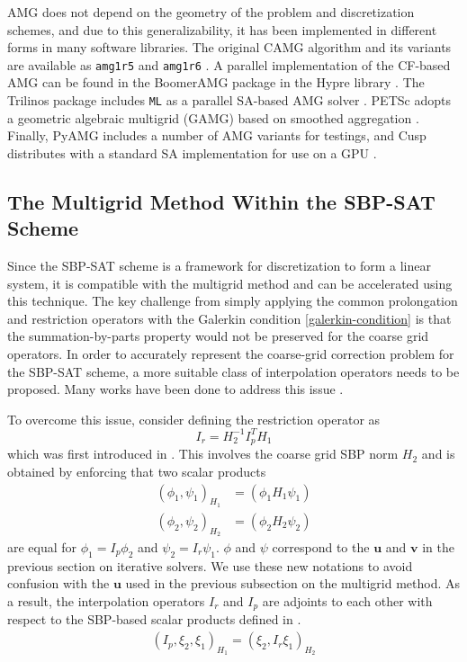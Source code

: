 AMG does not depend on the geometry of the problem and discretization schemes, and due to this generalizability, it has been implemented in different forms in many software libraries. The original CAMG algorithm and its variants are available as \texttt{amg1r5} and \texttt{amg1r6} \citep{ruge1987algebraic}. A parallel implementation of the CF-based AMG can be found in the BoomerAMG package in the Hypre library \citep{yang2002boomeramg}. The Trilinos package includes \texttt{ML} as a parallel SA-based AMG solver \citep{gee2006ml}.
PETSc adopts a geometric algebraic multigrid (GAMG) based on smoothed aggregation \citep{petsc-web-page}.
Finally, PyAMG includes a number of AMG variants for testings, and Cusp distributes with a standard SA implementation for use on a GPU \citep{dalton2014cusp,bell2022pyamg}. 

\subsection{The Multigrid Method Within the SBP-SAT Scheme}
Since the SBP-SAT scheme is a framework for discretization to form a linear system, it is compatible with the multigrid method and can be accelerated using this technique. The key challenge from simply applying the common prolongation and restriction operators with the Galerkin condition \autoref{galerkin-condition} is that the summation-by-parts property would not be preserved for the coarse grid operators. In order to accurately represent the coarse-grid correction problem for the SBP-SAT scheme, a more suitable class of interpolation operators needs to be proposed. Many works have been done to address this issue \citep{ruggiu2018new,RUGGIU2018216}.

To overcome this issue, consider defining the restriction operator as 
\begin{equation}
    I_r = H_2^{-1}I_p^TH_1
    \label{eqn:interpolation_sbp}
\end{equation}
which was first introduced in \citep{RUGGIU2018216}. This involves the coarse grid SBP norm $H_2$ and is obtained by enforcing that two scalar products
\begin{align}
    (\phi_1,\psi_1)_{H_1} &= (\phi_1H_1\psi_1) \\
     (\phi_2,\psi_2)_{H_2} &= (\phi_2H_2\psi_2)
\end{align}
are equal for $\phi_1 = I_p\phi_2$ and $\psi_2 = I_r \psi_1$. $\phi$ and $\psi$ correspond to the $\boldsymbol{u}$ and $\boldsymbol{v}$ in the previous section on iterative solvers. We use these new notations to avoid confusion with the $\mathbf{u}$ used in the previous subsection on the multigrid method. As a result, the interpolation operators $I_r$ and $I_p$ are adjoints to each other with respect to the SBP-based scalar products defined in \citep{hackbusch2013multi}.
\begin{align}
    (I_p,\xi_2,\xi_1)_{H_1} = (\xi_2,I_r\xi_1)_{H_2}
    \label{eqn:adjoint}
\end{align}

